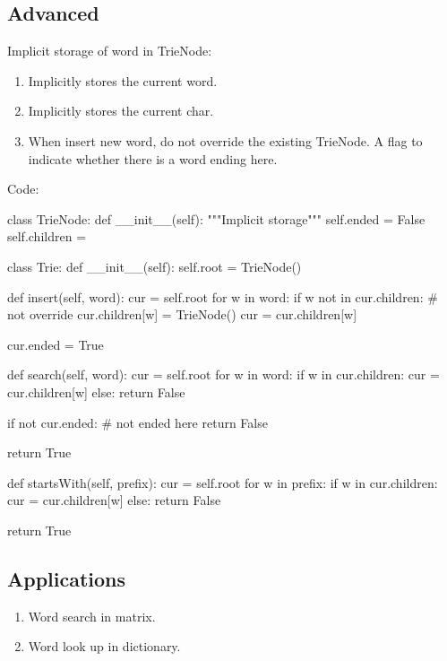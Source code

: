 \subsection{Advanced}
Implicit storage of word in TrieNode: 
\begin{enumerate}
\item Implicitly stores the current word. 
\item Implicitly stores the current char. 
\item When insert new word, do not override the existing TrieNode. A flag to indicate
whether there is a word ending here.
\end{enumerate}
\newpage
Code:
\begin{python}
class TrieNode:
    def __init__(self):
        """Implicit storage"""
        self.ended = False
        self.children = {}


class Trie:
    def __init__(self):
        self.root = TrieNode()

    def insert(self, word):
        cur = self.root
        for w in word:
            if w not in cur.children:   # not override
                cur.children[w] = TrieNode()
            cur = cur.children[w]

        cur.ended = True

    def search(self, word):
        cur = self.root
        for w in word:
            if w in cur.children:
                cur = cur.children[w]
            else:
                return False

        if not cur.ended:  # not ended here
            return False

        return True

    def startsWith(self, prefix):
        cur = self.root
        for w in prefix:
            if w in cur.children:
                cur = cur.children[w]
            else:
                return False

        return True
\end{python}
\subsection{Applications}
\begin{enumerate}
\item Word search in matrix.
\item Word look up in dictionary.
\end{enumerate}
        
     
